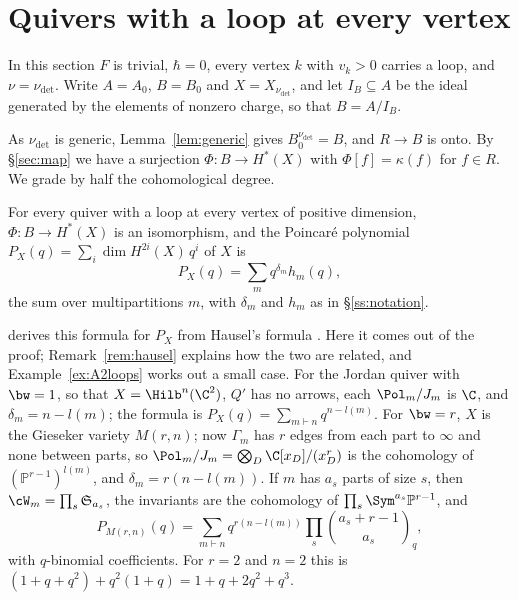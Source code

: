 \documentclass[11pt]{amsart}
\begin{document}
\section{Quivers with a loop at every vertex}\label{sec:loops}

In this section $F$ is trivial, $\hbar=0$, every vertex $k$ with $v_k>0$
carries a loop, and $\nu=\nu_{\det}$.  Write $A=A_0$, $B=B_0$ and
$X=X_{\nu_{\det}}$, and let $I_B\subseteq A$ be the ideal generated by the
elements of nonzero charge, so that $B=A/I_B$.

As $\nu_{\det}$ is generic, Lemma~\ref{lem:generic} gives
$B^{\nu_{\det}}_0=B$, and $R\to B$ is onto.  By \S\ref{sec:map} we have a
surjection $\Phi\colon B\to H^*(X)$ with $\Phi[f]=\kappa(f)$ for $f\in R$.  We
grade by half the cohomological degree.

\begin{theorem}\label{thm:loops}
For every quiver with a loop at every vertex of positive dimension,
$\Phi\colon B\to H^*(X)$ is an isomorphism, and the Poincar\'e polynomial
$P_X(q)=\sum_i\dim H^{2i}(X)\,q^i$ of $X$ is
\[
 P_X(q)=\sum_mq^{\delta_m}h_m(q),
\]
the sum over multipartitions $m$, with $\delta_m$ and $h_m$ as in
\S\ref{ss:notation}.
\end{theorem}

 derives this formula for $P_X$ from Hausel's
formula \cite{hauselBettiNumbers2006}.  Here it comes out of the proof;
Remark~\ref{rem:hausel} explains how the two are related, and
Example~\ref{ex:A2loops} works out a small case.  For the Jordan
quiver with $\bw=1$, so that $X=\Hilb^n(\C^2)$, $Q'$ has no arrows, each
$\Pol_m/J_m$ is $\C$, and $\delta_m=n-l(m)$; the formula is
$P_X(q)=\sum_{m\vdash n}q^{n-l(m)}$.  For $\bw=r$, $X$ is the Gieseker variety
$M(r,n)$; now $\Gamma_m$ has $r$ edges from each part to $\infty$ and none
between parts, so $\Pol_m/J_m=\bigotimes_D\C[x_D]/(x_D^r)$ is the cohomology of
$(\mathbb P^{r-1})^{l(m)}$, and $\delta_m=r(n-l(m))$.  If $m$ has $a_s$ parts of
size $s$, then $\cW_m=\prod_s\mathfrak S_{a_s}$, the invariants are the
cohomology of $\prod_s\Sym^{a_s}\mathbb P^{r-1}$, and
\[
 P_{M(r,n)}(q)=\sum_{m\vdash n}q^{r(n-l(m))}\prod_s\binom{a_s+r-1}{a_s}_{\!q},
\]
with $q$-binomial coefficients.  For $r=2$ and $n=2$ this is
$(1+q+q^2)+q^2(1+q)=1+q+2q^2+q^3$.
\end{document}
